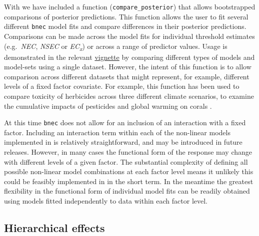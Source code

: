 With  we have included a function
(\texttt{compare\_posterior}) that allows bootstrapped comparisons of
posterior predictions. This function allows the user to fit several
different \texttt{bnec} model fits and compare differences in their
posterior predictions. Comparisons can be made across the model fits for
individual threshold estimates (e.g.~\emph{NEC}, \emph{NSEC} or
\emph{EC\textsubscript{x}}) or across a range of predictor values. Usage
is demonstrated in the relevant
\href{https://open-aims.github.io/bayesnec/articles/example4.html}{vignette}
by comparing different types of models and model-sets using a single
dataset. However, the intent of this function is to allow comparison
across different datasets that might represent, for example, different
levels of a fixed factor covariate. For example, this function has been
used to compare toxicity of herbicides across three different climate
scenarios, to examine the cumulative impacts of pesticides and global
warming on corals \citep{flores2021}.

At this time \texttt{bnec} does not allow for an inclusion of an
interaction with a fixed factor. Including an interaction term within
each of the non-linear models implemented in  is
relatively straightforward, and may be introduced in future releases.
However, in many cases the functional form of the response may change
with different levels of a given factor. The substantial complexity of
defining all possible non-linear model combinations at each factor level
means it unlikely this could be feasibly implemented in 
in the short term. In the meantime the greatest flexibility in the
functional form of individual model fits can be readily obtained using
models fitted independently to data within each factor level.

\hypertarget{hierarchical-effects}{%
\subsection{Hierarchical effects}\label{hierarchical-effects}}

